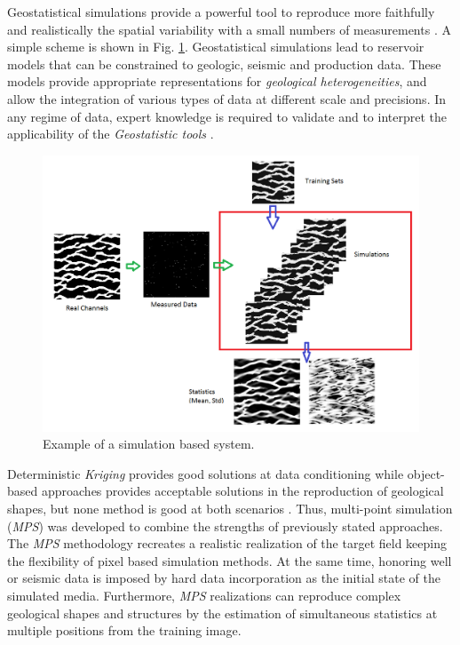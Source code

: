 	Geostatistical simulations provide a powerful tool to reproduce more faithfully and realistically the spatial variability with a small numbers of measurements \cite{Remy_2009_a,Ortiz_2004_a}. A simple scheme is shown in Fig. \ref{fig:MPSExample}. Geostatistical simulations lead to reservoir models that can be constrained to geologic, seismic and production data. These models provide appropriate representations for \textit{geological heterogeneities}, and allow the integration of various types of data at different scale and precisions. In any regime of data, expert knowledge is required to validate and to interpret the applicability of the \emph{Geostatistic tools} \cite{Oliver_2008_a, BKWSS06, Bangerth04onoptimization}. 


		\begin{figure}[H]
		\centering
		\includegraphics[width=0.7	\textwidth]{Figs_QE/Scheme.png}

		\caption{Example of a simulation based system.}
		\label{fig:MPSExample}
		\end{figure}


Deterministic \emph{Kriging} provides good solutions at data conditioning while object-based approaches provides acceptable solutions in the reproduction of geological shapes, but none method is good at both scenarios \cite{Lam_1983_a,Ortiz_2004_a,BKMPW05,olea_84_a}. Thus, multi-point simulation (\emph{MPS}) was developed to combine the strengths of previously stated approaches. The \emph{MPS} methodology recreates a realistic realization of the target field keeping the flexibility of pixel based simulation methods. At the same time, honoring well or seismic data is imposed by hard data incorporation as the initial state of the simulated media. Furthermore, \emph{MPS} realizations can reproduce complex geological shapes and structures by the estimation of simultaneous statistics at multiple positions from the training image.


